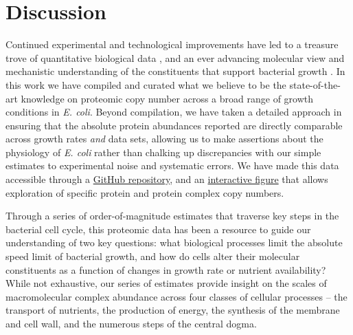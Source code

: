 \section{Discussion}
Continued experimental and technological improvements have led to a treasure
trove of quantitative biological data \citep{hui2015, schmidt2016, si2017,
gallagher2020, peebo2015, valgepea2013}, and an ever advancing molecular view
and mechanistic understanding of the constituents that support bacterial
growth \citep{taheriaraghi2015, morgenstein2015, si2019, karr2012,
kostinski2020, macklin2020}. In this work we have compiled and curated what
we believe to be the state-of-the-art knowledge on proteomic copy number
across a broad range of growth conditions in \textit{E. coli}. Beyond
compilation, we have taken a detailed approach in ensuring that the absolute
protein abundances reported are directly comparable across growth rates
\textit{and} data sets, allowing us to make assertions about the physiology
of \textit{E. coli} rather than chalking up discrepancies with our simple
estimates to experimental noise and systematic errors. We have made this data
accessible through a
\href{https://github.com/RPGroup-PBoC/growth_limits}{GitHub repository}, and
an
\href{https://rpgroup.caltech.edu/growth_limits//data_explorer}{interactive
figure} that allows exploration of specific protein and protein complex copy
numbers.

Through a series of order-of-magnitude estimates that traverse key
steps in the bacterial cell cycle, this proteomic data has been a resource to
guide our understanding of two key questions: what biological processes limit
the absolute speed limit of bacterial growth, and how do cells alter their
molecular constituents as a function of changes in growth rate or nutrient
availability? While not exhaustive, our series of estimates provide insight on
the scales of macromolecular complex abundance across four classes of cellular
processes -- the transport of nutrients, the production of energy, the synthesis
of the membrane and cell wall, and the numerous steps of the central dogma.

